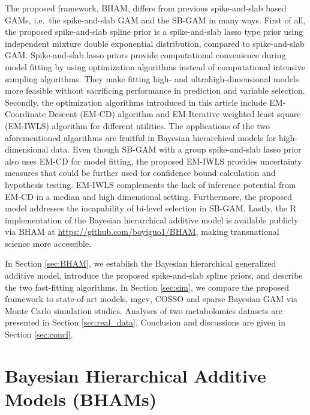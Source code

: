 \documentclass[AMA,STIX1COL,]{WileyNJD-v2}
\begin{document}
The proposed framework, BHAM, differs from previous spike-and-slab based
GAMs, i.e.~the spike-and-slab GAM \citep{Scheipl2012} and the SB-GAM
\citep{Bai2021} in many ways. First of all, the proposed spike-and-slab
spline prior is a spike-and-slab lasso type prior using independent
mixture double exponential distribution, compared to spike-and-slab GAM.
Spike-and-slab lasso priors provide computational convenience during
model fitting by using optimization algorithms instead of computational
intensive sampling algorithms. They make fitting high- and
ultrahigh-dimensional models more feasible without sacrificing
performance in prediction and variable selection. Secondly, the
optimization algorithms introduced in this article include EM-Coordinate
Descent (EM-CD) algorithm and EM-Iterative weighted least square
(EM-IWLS) algorithm for different utilities. The applications of the two
aforementioned algorithms are fruitful in Bayesian hierarchical models
for high-dimensional data. \citep{Yi2012, Rockova2014a, Rockova2018}
Even though SB-GAM with a group spike-and-slab lasso prior also uses
EM-CD for model fitting, the proposed EM-IWLS provides uncertainty
measures that could be further used for confidence bound calculation and
hypothesis testing. EM-IWLS complements the lack of inference potential
from EM-CD in a median and high dimensional setting. Furthermore, the
proposed model addresses the incapability of bi-level selection in
SB-GAM. Lastly, the R implementation of the Bayesian hierarchical
additive model is available publicly via BHAM at
\url{https://github.com/boyiguo1/BHAM}, making transnational science
more accessible.

In Section \ref{sec:BHAM}, we establish the Bayesian hierarchical
generalized additive model, introduce the proposed spike-and-slab spline
priors, and describe the two fast-fitting algorithms. In Section
\ref{sec:sim}, we compare the proposed framework to state-of-art models,
mgcv, COSSO and sparse Bayesian GAM via Monte Carlo simulation studies.
Analyses of two metabolomics datasets are presented in Section
\ref{sec:real_data}. Conclusion and discussions are given in Section
\ref{sec:concl}.

\hypertarget{bayesian-hierarchical-additive-models-bhams}{%
\section{Bayesian Hierarchical Additive Models
(BHAMs)}\label{bayesian-hierarchical-additive-models-bhams}}
\end{document}
